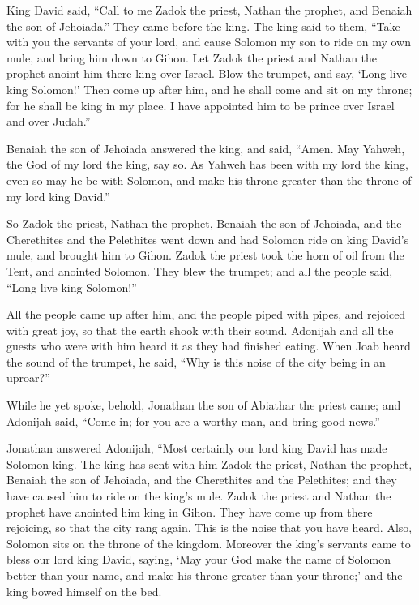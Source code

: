 {\par }{\PP {}King David said, “Call to me Zadok the priest, Nathan the prophet, and Benaiah the son of Jehoiada.” They came before the king.
The king said to them, “Take with you the servants of your lord, and cause Solomon my son to ride on my own mule, and bring him down to Gihon.
Let Zadok the priest and Nathan the prophet anoint him there king over Israel. Blow the trumpet, and say, ‘Long live king Solomon!’
Then come up after him, and he shall come and sit on my throne; for he shall be king in my place. I have appointed him to be prince over Israel and over Judah.”
\par }{\PP {}Benaiah the son of Jehoiada answered the king, and said, “Amen. May Yahweh, the God of my lord the king, say so.
As Yahweh has been with my lord the king, even so may he be with Solomon, and make his throne greater than the throne of my lord king David.”
\par }{\PP {}So Zadok the priest, Nathan the prophet, Benaiah the son of Jehoiada, and the Cherethites and the Pelethites went down and had Solomon ride on king David’s mule, and brought him to Gihon.
Zadok the priest took the horn of oil from the Tent, and anointed Solomon. They blew the trumpet; and all the people said, “Long live king Solomon!”
\par }{\PP {}All the people came up after him, and the people piped with pipes, and rejoiced with great joy, so that the earth shook with their sound.
Adonijah and all the guests who were with him heard it as they had finished eating. When Joab heard the sound of the trumpet, he said, “Why is this noise of the city being in an uproar?”
\par }{\PP {}While he yet spoke, behold, Jonathan the son of Abiathar the priest came; and Adonijah said, “Come in; for you are a worthy man, and bring good news.”
\par }{\PP {}Jonathan answered Adonijah, “Most certainly our lord king David has made Solomon king.
The king has sent with him Zadok the priest, Nathan the prophet, Benaiah the son of Jehoiada, and the Cherethites and the Pelethites; and they have caused him to ride on the king’s mule.
Zadok the priest and Nathan the prophet have anointed him king in Gihon. They have come up from there rejoicing, so that the city rang again. This is the noise that you have heard.
Also, Solomon sits on the throne of the kingdom.
Moreover the king’s servants came to bless our lord king David, saying, ‘May your God make the name of Solomon better than your name, and make his throne greater than your throne;’ and the king bowed himself on the bed.
}
